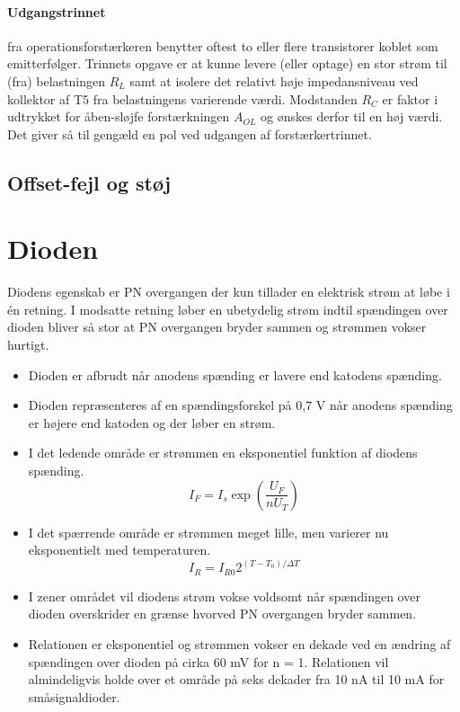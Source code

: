\documentclass[danish]{article}
\begin{document}
\paragraph{Udgangstrinnet} fra operationsforstærkeren benytter oftest to eller flere transistorer koblet som emitterfølger. Trinnets opgave er at kunne levere (eller optage) en stor strøm til (fra) belastningen $R_L$ samt at isolere det relativt høje impedansniveau ved kollektor af T5 fra belastningens varierende værdi. Modstanden $R_C$ er faktor i udtrykket for åben-sløjfe forstærkningen $A_{OL}$ og ønskes derfor til en høj værdi. Det giver så til gengæld en pol ved udgangen af forstærkertrinnet.

\subsection{Offset-fejl og støj}

\newpage
\section{Dioden}
Diodens egenskab er PN overgangen der kun tillader en elektrisk strøm at løbe i én retning. 
I modsatte retning løber en ubetydelig strøm indtil spændingen over dioden bliver så stor at PN overgangen bryder sammen og strømmen vokser hurtigt.

\begin{itemize}
	\item Dioden er afbrudt når anodens spænding er lavere end katodens spænding.
	\item Dioden repræsenteres af en spændingsforskel på 0,7 V når anodens spænding er højere end katoden og der løber en strøm.
\end{itemize}

\begin{itemize}
	\item I det ledende område er strømmen en eksponentiel funktion af diodens spænding.
	\begin{equation}
	I_F = I_s \exp \left(\dfrac{U_F}{n U_T}\right)
	\end{equation}
	\item I det spærrende område er strømmen meget lille, men varierer nu eksponentielt med temperaturen. 
	\begin{equation}
	I_R = I_{R0} 2^{(T-T_0)/\Delta{T}}
	\end{equation}
	\item I zener området vil diodens strøm vokse voldsomt når spændingen over dioden overskrider en grænse hvorved PN overgangen bryder sammen.
	\item Relationen er eksponentiel og strømmen vokser en dekade
	ved en ændring af spændingen over dioden på cirka 60 mV for n = 1. Relationen vil almindeligvis holde over et område på seks dekader fra 10 nA til 10 mA for småsignaldioder.
\end{itemize}
\end{document}
